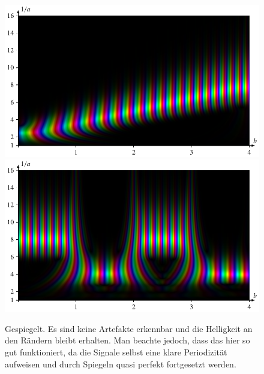 \begin{figure}
	\centering
	\includegraphics[width=\linewidth, keepaspectratio]{papers/complex/images/padding_sym_sweep.pdf}
	\includegraphics[width=\linewidth, keepaspectratio]{papers/complex/images/padding_sym_square.pdf}
	\caption{Gespiegelt. Es sind keine Artefakte erkennbar und die Helligkeit an den Rändern bleibt erhalten. Man beachte jedoch, dass das hier so gut funktioniert, da die Signale selbst eine klare Periodizität aufweisen und durch Spiegeln quasi perfekt fortgesetzt werden.}
	\label{complex:padding-sym}
\end{figure}

